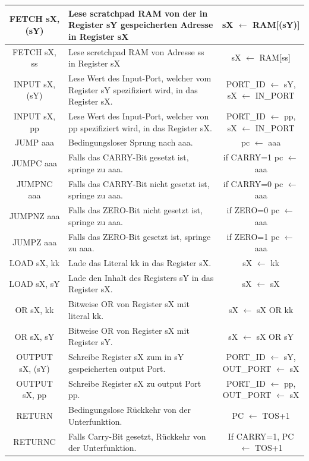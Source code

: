 \documentclass{scrartcl}
\begin{document}
\begin{longtable}{||c|p{4cm}|c||}
         FETCH sX, (sY) & Lese scratchpad RAM von der in Register sY gespeicherten Adresse in Register sX &sX $\leftarrow$ RAM[(sY)]   \\ \hline
         FETCH sX, ss & Lese scretchpad RAM von Adresse ss in Register sX &sX $\leftarrow$ RAM[ss]  \\ \hline
         INPUT sX, (sY) & Lese Wert des Input-Port, welcher vom Register sY spezifiziert wird, in das Register sX. &PORT\_ID $\leftarrow$ sY, sX $\leftarrow$ IN\_PORT  \\ \hline
         INPUT sX, pp & Lese Wert des Input-Port, welcher von pp spezifiziert wird, in das Register sX. &PORT\_ID $\leftarrow$ pp, sX $\leftarrow$ IN\_PORT \\ \hline
         JUMP aaa & Bedingungsloser Sprung nach aaa. &pc $\leftarrow$ aaa  \\ \hline
         JUMPC aaa & Falls das CARRY-Bit gesetzt ist, springe zu aaa. & if CARRY=1 pc $\leftarrow$ aaa \\ \hline
         JUMPNC aaa & Falls das CARRY-Bit nicht gesetzt ist, springe zu aaa. &if CARRY=0 pc $\leftarrow$ aaa  \\ \hline
         JUMPNZ aaa & Falls das ZERO-Bit nicht gesetzt ist, springe zu aaa. &if ZERO=0 pc $\leftarrow$ aaa  \\ \hline
         JUMPZ aaa & Falls das ZERO-Bit gesetzt ist, springe zu aaa. &if ZERO=1 pc $\leftarrow$ aaa  \\ \hline 
         LOAD sX, kk & Lade das Literal kk in das Register sX. &sX $\leftarrow$ kk   \\ \hline
         LOAD sX, sY & Lade den Inhalt des Registers sY in das Register sX. &sX $\leftarrow$ sX  \\ \hline 
         OR sX, kk & Bitweise OR von Register sX mit literal kk. &sX $\leftarrow$ sX OR kk   \\ \hline
         OR sX, sY & Bitweise OR von Register sX mit Register sY. & sX $\leftarrow$ sX OR sY   \\ \hline
         OUTPUT sX, (sY) & Schreibe Register sX zum in sY gespeicherten output Port. &PORT\_ID $\leftarrow$ sY, OUT\_PORT $\leftarrow$ sX  \\ \hline
         OUTPUT sX, pp & Schreibe Register sX zu output Port pp. &PORT\_ID $\leftarrow$ pp, OUT\_PORT $\leftarrow$ sX  \\ \hline
         RETURN & Bedingungslose Rückkehr von der Unterfunktion. & PC $\leftarrow$ TOS+1  \\ \hline
         RETURNC & Falls Carry-Bit gesetzt, Rückkehr von der Unterfunktion. & If CARRY=1, PC $\leftarrow$ TOS+1 \\ \hline

\end{longtable}
\end{document}
